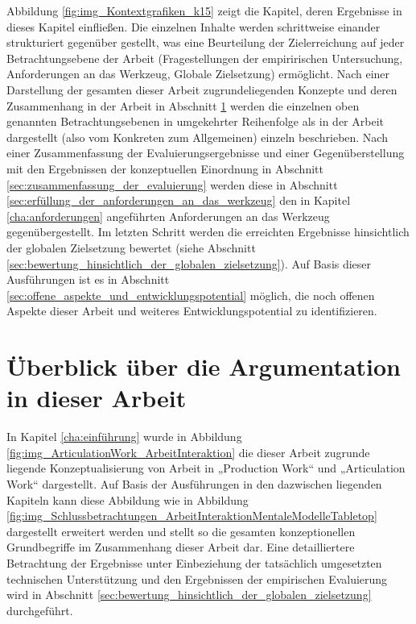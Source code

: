 Abbildung \ref{fig:img_Kontextgrafiken_k15} zeigt die Kapitel, deren Ergebnisse in dieses Kapitel einfließen. Die einzelnen Inhalte werden schrittweise einander strukturiert gegenüber gestellt, was eine Beurteilung der Zielerreichung auf jeder Betrachtungsebene der Arbeit (Fragestellungen der empiririschen Untersuchung, Anforderungen an das Werkzeug, Globale Zielsetzung) ermöglicht. Nach einer Darstellung der gesamten dieser Arbeit zugrundeliegenden Konzepte und deren Zusammenhang in der Arbeit in Abschnitt \ref{sec:überblick_über_den_gesamtzusammenhang} werden die einzelnen oben genannten Betrachtungsebenen in umgekehrter Reihenfolge als in der Arbeit dargestellt (also vom Konkreten zum Allgemeinen) einzeln beschrieben. Nach einer Zusammenfassung der Evaluierungsergebnisse und einer Gegenüberstellung mit den Ergebnissen der konzeptuellen Einordnung in Abschnitt \ref{sec:zusammenfassung_der_evaluierung} werden diese in Abschnitt \ref{sec:erfüllung_der_anforderungen_an_das_werkzeug} den in Kapitel \ref{cha:anforderungen} angeführten Anforderungen an das Werkzeug gegenübergestellt. Im letzten Schritt werden die erreichten Ergebnisse hinsichtlich der globalen Zielsetzung bewertet (siehe Abschnitt \ref{sec:bewertung_hinsichtlich_der_globalen_zielsetzung}). Auf Basis dieser Ausführungen ist es in Abschnitt \ref{sec:offene_aspekte_und_entwicklungspotential} möglich, die noch offenen Aspekte dieser Arbeit und weiteres Entwicklungspotential zu identifizieren.

\section{Überblick über die Argumentation in dieser Arbeit} %
\label{sec:überblick_über_den_gesamtzusammenhang}

In Kapitel \ref{cha:einführung} wurde in Abbildung \ref{fig:img_ArticulationWork_ArbeitInteraktion} die dieser Arbeit zugrunde liegende Konzeptualisierung von Arbeit in „Production Work“ und „Articulation Work“ dargestellt. Auf Basis der Ausführungen in den dazwischen liegenden Kapiteln kann diese Abbildung wie in Abbildung \ref{fig:img_Schlussbetrachtungen_ArbeitInteraktionMentaleModelleTabletop} dargestellt erweitert werden und stellt so die gesamten konzeptionellen Grundbegriffe im Zusammenhang dieser Arbeit dar. Eine detailliertere Betrachtung der Ergebnisse unter Einbeziehung der tatsächlich umgesetzten technischen Unterstützung und den Ergebnissen der empirischen Evaluierung wird in Abschnitt \ref{sec:bewertung_hinsichtlich_der_globalen_zielsetzung} durchgeführt.

